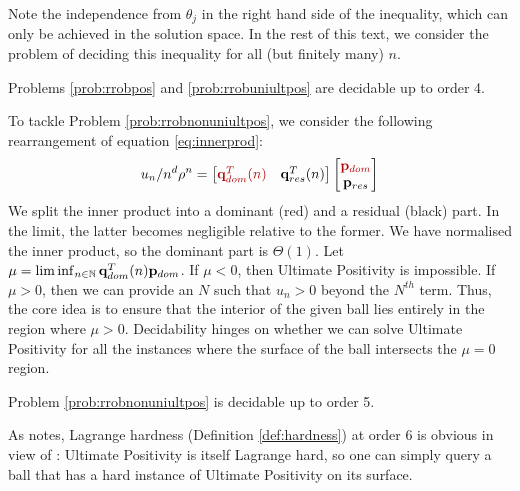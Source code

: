 Note the independence from $\theta_j$ in the right hand side of the inequality, which can only be achieved in the solution space. In the rest of this text, we consider the problem of deciding this inequality for all (but finitely many) $n$.

\begin{theorem}
\label{thm:decide}
Problems \ref{prob:rrobpos} and \ref{prob:rrobuniultpos} are decidable up to order 4.
\end{theorem}

To tackle Problem \ref{prob:rrobnonuniultpos}, we consider the following rearrangement of equation \ref{eq:innerprod}:
\begin{equation}
\label{eq:grouping}
u_n/n^d\rho^n = \begin{bmatrix}
{\color{red!70!black} \mathbf{q}_{dom}^T(n) } & \mathbf{q}_{res}^T(n)
\end{bmatrix}
\begin{bmatrix}
{\color{red!70!black} \mathbf{p}_{dom}} \\
\mathbf{p}_{res}
\end{bmatrix}
\end{equation}
We split the inner product into a dominant ({\color{red!70!black}red}) and a residual (black) part. In the limit, the latter becomes negligible relative to the former. We have normalised the inner product, so the dominant part is $\Theta(1)$. Let $\mu = \liminf_{n\in \mathbb{N}}\mathbf{q}_{dom}^T(n)\mathbf{p}_{dom}$. If $\mu < 0$, then Ultimate Positivity is impossible. If $\mu > 0$, then we can provide an $N$ such that $u_n > 0$ beyond the $N^{th}$ term. Thus, the core idea is to ensure that the interior of the given ball lies entirely in the region where $\mu > 0$. Decidability hinges on whether we can solve Ultimate Positivity for all the instances where the surface of the ball intersects the $\mu = 0$ region.

\begin{theorem}
\label{thm:decide2}
Problem \ref{prob:rrobnonuniultpos} is decidable up to order 5.
\end{theorem}

As \cite{originalarxiv} notes, Lagrange hardness (Definition \ref{def:hardness}) at order 6 is obvious in view of \cite{joeljames3}: Ultimate Positivity is itself Lagrange hard, so one can simply query a ball that has a hard instance of Ultimate Positivity on its surface.

